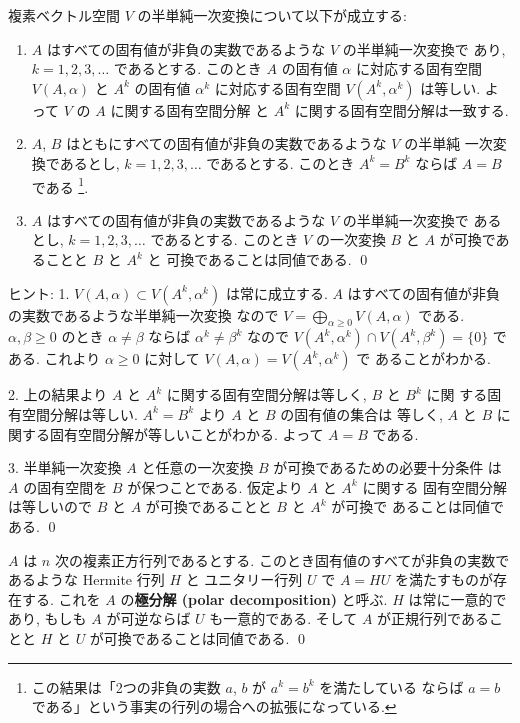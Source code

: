 \documentclass[12pt,twoside]{jarticle}
\begin{document}
\begin{question}
\label{q:semipositive-A-and-A^k}
  複素ベクトル空間 $V$ の半単純一次変換について以下が成立する:
  \begin{enumerate}
  \item $A$ はすべての固有値が非負の実数であるような $V$ の半単純一次変換で
    あり, $k=1,2,3,\ldots$ であるとする.
    このとき $A$ の固有値 $\alpha$ に対応する固有空間 $V(A,\alpha)$ 
    と $A^k$ の固有値 $\alpha^k$ に対応する固有空間 $V(A^k,\alpha^k)$ は等しい.
    よって $V$ の $A$ に関する固有空間分解
    と $A^k$ に関する固有空間分解は一致する.
  \item $A$, $B$ はともにすべての固有値が非負の実数であるような $V$ の半単純
    一次変換であるとし, $k=1,2,3,\ldots$ であるとする. 
    このとき $A^k=B^k$ ならば $A=B$ である%
    \footnote{この結果は「2つの非負の実数 $a$, $b$ が $a^k=b^k$ を満たしている
      ならば $a=b$ である」という事実の行列の場合への拡張になっている.}.
  \item $A$ はすべての固有値が非負の実数であるような $V$ の半単純一次変換で
    あるとし, $k=1,2,3,\ldots$ であるとする.
    このとき $V$ の一次変換 $B$ と $A$ が可換であることと $B$ と $A^k$ と
    可換であることは同値である.
    \qed
  \end{enumerate}
\end{question}

\noindent
ヒント: 1. $V(A,\alpha)\subset V(A^k,\alpha^k)$ は常に成立する.
$A$ はすべての固有値が非負の実数であるような半単純一次変換
なので $V=\bigoplus_{\alpha\ge 0}V(A,\alpha)$ である.
$\alpha,\beta\ge0$ のとき $\alpha\ne\beta$ ならば $\alpha^k\ne\beta^k$ 
なので $V(A^k,\alpha^k)\cap V(A^k,\beta^k)=\{0\}$ である.
これより $\alpha\ge 0$ に対して $V(A,\alpha)=V(A^k,\alpha^k)$ で
あることがわかる.

2. 上の結果より $A$ と $A^k$ に関する固有空間分解は等しく, $B$ と $B^k$ に関
する固有空間分解は等しい.  $A^k=B^k$ より $A$ と $B$ の固有値の集合は
等しく, $A$ と $B$ に関する固有空間分解が等しいことがわかる.
よって $A=B$ である.

3. 半単純一次変換 $A$ と任意の一次変換 $B$ が可換であるための必要十分条件
は $A$ の固有空間を $B$ が保つことである.  仮定より $A$ と $A^k$ に関する
固有空間分解は等しいので $B$ と $A$ が可換であることと $B$ と $A^k$ が可換で
あることは同値である.
\qed


\begin{question}[極分解]
  $A$ は $n$ 次の複素正方行列であるとする.
  このとき固有値のすべてが非負の実数であるような Hermite 行列 $H$ と
  ユニタリー行列 $U$ で $A=HU$ を満たすものが存在する.
  これを $A$ の{\bf 極分解 (polar decomposition)} と呼ぶ.
  $H$ は常に一意的であり, もしも $A$ が可逆ならば $U$ も一意的である.
  そして $A$ が正規行列であることと $H$ と $U$ が可換であることは同値である.
  \qed
\end{question}
\end{document}
